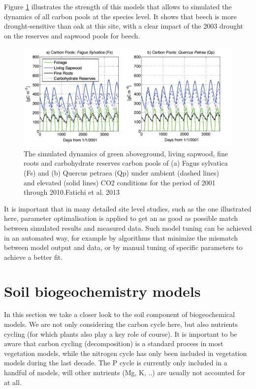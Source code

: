 \documentclass[12pt,oneside]{book}
\begin{document}
Figure \ref{fig:f513} illustrates the strength of this models that
allows to simulated the dynamics of all carbon pools at the species
level. It shows that beech is more drought-sensitive than oak at this
site, with a clear impact of the 2003 drought on the reserves and
sapwood pools for beech.

\begin{figure}

{\centering \includegraphics[width=0.8\linewidth]{figures/chap5/f513_fatichi_pools} 

}

\caption{The simulated dynamics of green aboveground, living sapwood, fine roots and carbohydrate reserves carbon pools of (a) Fagus sylvatica (Fs) and (b) Quercus petraea (Qp) under ambient (dashed lines) and elevated (solid lines) CO2 conditions for the period of 2001 through 2010.Fatichi et al. 2013}\label{fig:f513}
\end{figure}

It is important that in many detailed site level studies, such as the
one illustrated here, parameter optimalisation is applied to get an as
good as possible match between simulated results and measured data. Such
model tuning can be achieved in an automated way, for example by
algorithms that minimize the mismatch between model output and data, or
by manual tuning of specific parameters to achieve a better fit.

\section{Soil biogeochemistry models}\label{soil-biogeochemistry-models}

In this section we take a closer look to the soil component of
biogeochemical models. We are not only considering the carbon cycle
here, but also nutrients cycling (for which plants also play a key role
of course). It is important to be aware that carbon cycling
(decomposition) is a standard process in most vegetation models, while
the nitrogen cycle has only been included in vegetation models during
the last decade. The P cycle is currently only included in a handful of
models, will other nutrients (Mg, K, ..) are usually not accounted for
at all.
\end{document}
